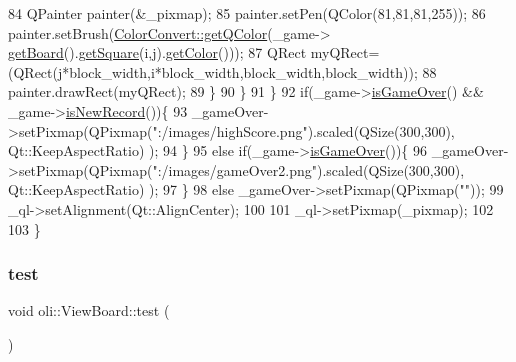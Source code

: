 \begin{DoxyCode}
84                 QPainter painter(&\_pixmap);
85                 painter.setPen(QColor(81,81,81,255));
86                 painter.setBrush(\hyperlink{classoli_1_1_color_convert_a4c41280d24ad2cba4b2a46fbb03f2356}{ColorConvert::getQColor}(\_game->
      \hyperlink{classoli_1_1_floodgame_a4775f2321f034778d4de93a888d2283b}{getBoard}().\hyperlink{classoli_1_1_board_a5c1ce624776b1169ee16d8d815e9a453}{getSquare}(i,j).\hyperlink{classoli_1_1_square_a7709b35684fb5754e53d138bb916880c}{getColor}()));
87                 QRect myQRect=(QRect(j*block\_width,i*block\_width,block\_width,block\_width));
88                 painter.drawRect(myQRect);
89             \}
90         \}
91     \}
92     \textcolor{keywordflow}{if}(\_game->\hyperlink{classoli_1_1_floodgame_adfcb41900bae06b64a8d4d77164b67d5}{isGameOver}() && \_game->\hyperlink{classoli_1_1_floodgame_a35b5e1c7f39c73d7d46b8c71156fbfbc}{isNewRecord}())\{
93         \_gameOver->setPixmap(QPixmap(\textcolor{stringliteral}{":/images/highScore.png"}).scaled(QSize(300,300),  Qt::KeepAspectRatio)
      );
94     \}
95     \textcolor{keywordflow}{else} \textcolor{keywordflow}{if}(\_game->\hyperlink{classoli_1_1_floodgame_adfcb41900bae06b64a8d4d77164b67d5}{isGameOver}())\{
96         \_gameOver->setPixmap(QPixmap(\textcolor{stringliteral}{":/images/gameOver2.png"}).scaled(QSize(300,300),  Qt::KeepAspectRatio)
      );
97     \}
98     \textcolor{keywordflow}{else} \_gameOver->setPixmap(QPixmap(\textcolor{stringliteral}{""}));
99     \_ql->setAlignment(Qt::AlignCenter);
100 
101     \_ql->setPixmap(\_pixmap);
102 
103 \}
\end{DoxyCode}
\hypertarget{classoli_1_1_view_board_a6490954a9baf4e72e899ba10a4f414b7}{}\label{classoli_1_1_view_board_a6490954a9baf4e72e899ba10a4f414b7} 
\subsubsection{\texorpdfstring{test}{test}}
{\footnotesize\ttfamily void oli\+::\+View\+Board\+::test (\begin{DoxyParamCaption}{ }\end{DoxyParamCaption})\hspace{0.3cm}{\ttfamily [signal]}}

\hypertarget{classoli_1_1_view_board_a487ea5886ec5de0422fc6e060aa7045b}{}\label{classoli_1_1_view_board_a487ea5886ec5de0422fc6e060aa7045b} 

